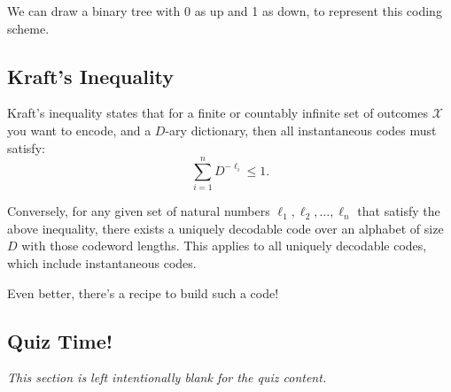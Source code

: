 We can draw a binary tree with 0 as up and 1 as down, to represent this coding scheme.

\subsection{Kraft's Inequality}

Kraft's inequality states that for a finite or countably infinite set of outcomes \( \mathcal{X} \) you want to encode, and a \( D \)-ary dictionary, then all instantaneous codes must satisfy:
\[ \sum_{i=1}^n D^{-\ell_i} \leq 1. \]

Conversely, for any given set of natural numbers \( \ell_1, \ell_2, \ldots, \ell_n \) that satisfy the above inequality, there exists a uniquely decodable code over an alphabet of size \( D \) with those codeword lengths. This applies to all uniquely decodable codes, which include instantaneous codes.

Even better, there's a recipe to build such a code!

\subsection{Quiz Time!}

\emph{This section is left intentionally blank for the quiz content.}
